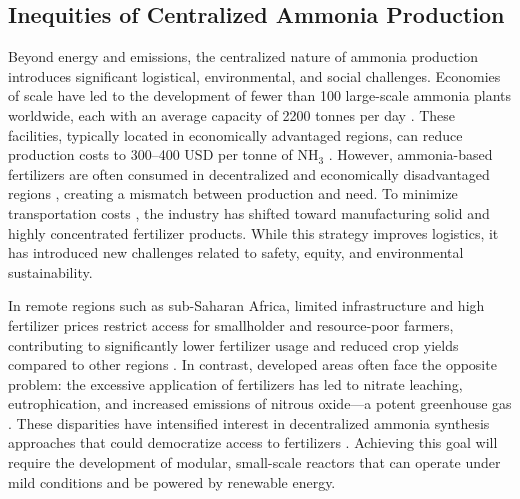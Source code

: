 \subsection{Inequities of Centralized Ammonia Production}
Beyond energy and emissions, the centralized nature of ammonia production introduces significant logistical, environmental, and social challenges. Economies of scale have led to the development of fewer than 100 large-scale ammonia plants worldwide, each with an average capacity of 2200 tonnes per day \cite{McArthur2017FertilizingDevelopment, Bartels2008AEconomy}. These facilities, typically located in economically advantaged regions, can reduce production costs to 300–400 USD per tonne of NH$_3$ \cite{liu2021prospects}. However, ammonia-based fertilizers are often consumed in decentralized and economically disadvantaged regions \cite{Comer2019ProspectsFertilizers}, creating a mismatch between production and need. To minimize transportation costs \cite{BonillaCedrez2020SpatialAfrica, Srivastava2023ProspectsFertilizers}, the industry has shifted toward manufacturing solid and highly concentrated fertilizer products. While this strategy improves logistics, it has introduced new challenges related to safety, equity, and environmental sustainability.

In remote regions such as sub-Saharan Africa, limited infrastructure and high fertilizer prices restrict access for smallholder and resource-poor farmers, contributing to significantly lower fertilizer usage and reduced crop yields compared to other regions \cite{Gilbert2012AfricanPoor, Mueller2012ClosingManagement, vanderVelde2014AfricanConsumption, Erisman2008HowWorld}. In contrast, developed areas often face the opposite problem: the excessive application of fertilizers has led to nitrate leaching, eutrophication, and increased emissions of nitrous oxide—a potent greenhouse gas \cite{ West2002AStates, Diaz2008SpreadingEcosystems, Stevens2019NitrogenEnvironment}. These disparities have intensified interest in decentralized ammonia synthesis approaches that could democratize access to fertilizers \cite{Tonelli2024Cost-competitiveSecurity, DAngelo2023EnvironmentalEnergy, Martin2019ElectrocatalyticLeaf}. Achieving this goal will require the development of modular, small-scale reactors that can operate under mild conditions and be powered by renewable energy.


